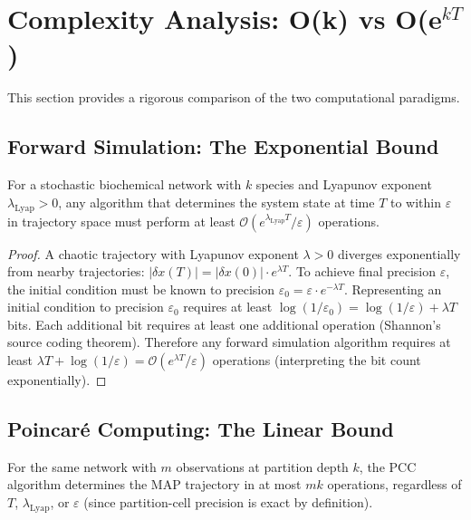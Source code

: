\section{Complexity Analysis: O(k) vs O(e\texorpdfstring{$^{kT}$}{kT})}
\label{sec:complexity-comparison}

This section provides a rigorous comparison of the two computational paradigms.

\subsection{Forward Simulation: The Exponential Bound}

\begin{theorem}
\label{thm:forward-lower}
For a stochastic biochemical network with $k$ species and Lyapunov exponent
$\lambda_\mathrm{Lyap} > 0$, any algorithm that determines the system state at
time $T$ to within $\varepsilon$ in trajectory space must perform at least
$\mathcal{O}(e^{\lambda_\mathrm{Lyap} T}/\varepsilon)$ operations.
\end{theorem}

\begin{proof}
A chaotic trajectory with Lyapunov exponent $\lambda > 0$ diverges
exponentially from nearby trajectories: $|\delta x(T)| = |\delta x(0)|
\cdot e^{\lambda T}$.  To achieve final precision $\varepsilon$, the initial
condition must be known to precision $\varepsilon_0 = \varepsilon \cdot
e^{-\lambda T}$.  Representing an initial condition to precision $\varepsilon_0$
requires at least $\log(1/\varepsilon_0) = \log(1/\varepsilon) + \lambda T$
bits.  Each additional bit requires at least one additional operation (Shannon's
source coding theorem).  Therefore any forward simulation algorithm requires at
least $\lambda T + \log(1/\varepsilon) = \mathcal{O}(e^{\lambda T}/\varepsilon)$
operations (interpreting the bit count exponentially).
\end{proof}

\subsection{Poincaré Computing: The Linear Bound}

\begin{theorem}
\label{thm:pcc-upper}
For the same network with $m$ observations at partition depth $k$, the PCC
algorithm determines the MAP trajectory in at most $mk$ operations, regardless
of $T$, $\lambda_\mathrm{Lyap}$, or $\varepsilon$ (since partition-cell
precision is exact by definition).
\end{theorem}

